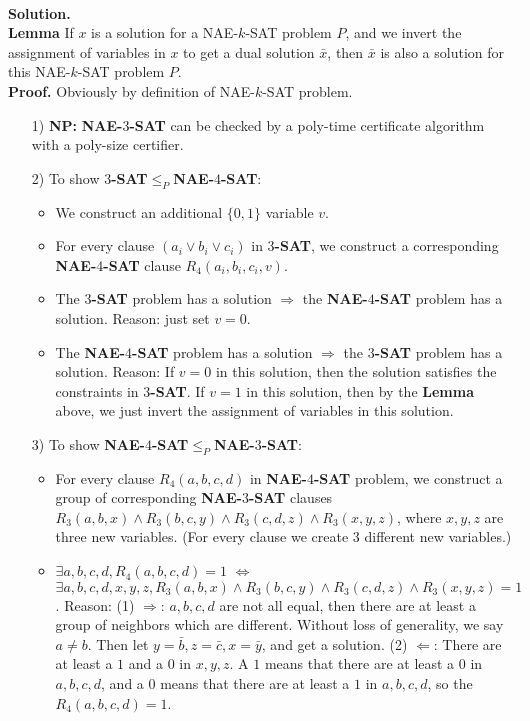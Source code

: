 \documentclass{article}
\begin{document}
\begin{enumerate}
~\\
\textbf{Solution.}\\
\textbf{Lemma} \label{lemma1}If $x$ is a solution for a NAE-$k$-SAT problem $P$, and we invert the assignment of variables in $x$ to get a dual solution $\bar{x}$, then $\bar{x}$ is also a solution for this NAE-$k$-SAT problem $P$.\\
\textbf{Proof.} Obviously by definition of NAE-$k$-SAT problem.
\begin{itemize}
    \item [1)] \textbf{NP:} \textbf{NAE-$3$-SAT} can be checked by a poly-time certificate algorithm with a poly-size certifier.
    \item [2)] To show \textbf{$3$-SAT}$\leq_P$\textbf{NAE-$4$-SAT}:
        \begin{itemize}
            \item We construct an additional $\{0,1\}$ variable $v$.
            \item For every clause $(a_i\vee b_i\vee c_i)$ in \textbf{$3$-SAT}, we construct a corresponding \textbf{NAE-$4$-SAT} clause $R_4(a_i,b_i,c_i,v)$.
            \item The \textbf{$3$-SAT} problem has a solution $\Rightarrow$ the \textbf{NAE-$4$-SAT} problem has a solution. Reason: just set $v=0$.
            \item The \textbf{NAE-$4$-SAT} problem has a solution $\Rightarrow$ the \textbf{$3$-SAT} problem has a solution. Reason: If $v=0$ in this solution, then the solution satisfies the constraints in \textbf{$3$-SAT}. If $v=1$ in this solution, then by the \textbf{Lemma} above, we just invert the assignment of variables in this solution.
        \end{itemize}
    \item [3)] To show \textbf{NAE-$4$-SAT}$\leq_P$\textbf{NAE-$3$-SAT}:
        \begin{itemize}
            \item For every clause $R_4(a,b,c,d)$ in \textbf{NAE-$4$-SAT} problem, we construct a group of corresponding \textbf{NAE-$3$-SAT} clauses $R_3(a,b,x)\wedge R_3(b,c,y) \wedge R_3(c,d,z) \wedge R_3(x,y,z)$, where $x,y,z$ are three new variables. (For every clause we create $3$ different new variables.)
            \item $\exists a,b,c,d, R_4(a,b,c,d)=1$ $\Leftrightarrow$ $\exists a,b,c,d,x,y,z, R_3(a,b,x)\wedge R_3(b,c,y)\wedge R_3(c,d,z)\wedge R_3(x,y,z) = 1$. Reason: (1) $\Rightarrow$: $a,b,c,d$ are not all equal, then there are at least a group of neighbors which are different. Without loss of generality, we say $a\ne b$. Then let $y=\bar{b},z=\bar{c},x=\bar{y}$, and get a solution. (2) $\Leftarrow$: There are at least a $1$ and a $0$ in $x,y,z$. A $1$ means that there are at least a $0$ in $a,b,c,d$, and a $0$ means that there are at least a $1$ in $a,b,c,d$, so the $R_4(a,b,c,d)=1$.

\end{itemize}
\end{itemize}
\end{enumerate}
\end{document}
